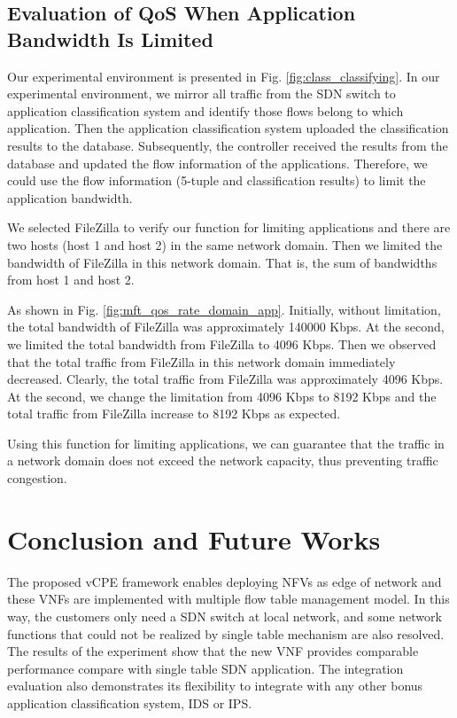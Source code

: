 \documentclass[conference]{IEEEtran}
\begin{document}
\subsection{Evaluation of QoS When Application Bandwidth Is Limited}
Our experimental environment is presented in Fig. \ref{fig:class_classifying}.
In our experimental environment, we mirror all traffic from the SDN switch to application classification system \cite{che-chuan-apnoms} and identify those flows belong to which application.
Then the application classification system uploaded the classification results to the database.
Subsequently, the controller received the results from the database and updated the flow information of the applications.
Therefore, we could use the flow information (5-tuple and classification results) to limit the application bandwidth.

We selected FileZilla to verify our function for limiting applications and there are two hosts (host 1 and host 2) in the same network domain.
Then we limited the bandwidth of FileZilla in this network domain. That is, the sum of bandwidths from host 1 and host 2.

As shown in Fig. \ref{fig:mft_qos_rate_domain_app}.
Initially, without limitation, the total bandwidth of FileZilla was approximately 140000 Kbps.
At the  second, we limited the total bandwidth from FileZilla to 4096 Kbps.
Then we observed that the total traffic from FileZilla in this network domain immediately decreased.
Clearly, the total traffic from FileZilla was approximately 4096 Kbps.
At the  second, we change the limitation from 4096 Kbps to 8192 Kbps and the total traffic from FileZilla increase to 8192 Kbps as expected.

Using this function for limiting applications, we can guarantee that the traffic in a network domain does not exceed the network capacity, thus preventing traffic congestion.




\section{Conclusion and Future Works}
The proposed vCPE framework enables deploying NFVs as edge of network and these VNFs are implemented with multiple flow table management model. In this way, the customers only need a SDN switch at local network, and some network functions that could not be realized by single table mechanism are also resolved. The results of the experiment show that the new VNF provides comparable performance compare with single table SDN application. The integration evaluation also demonstrates its flexibility to integrate with any other bonus application classification system, IDS or IPS.
\end{document}
